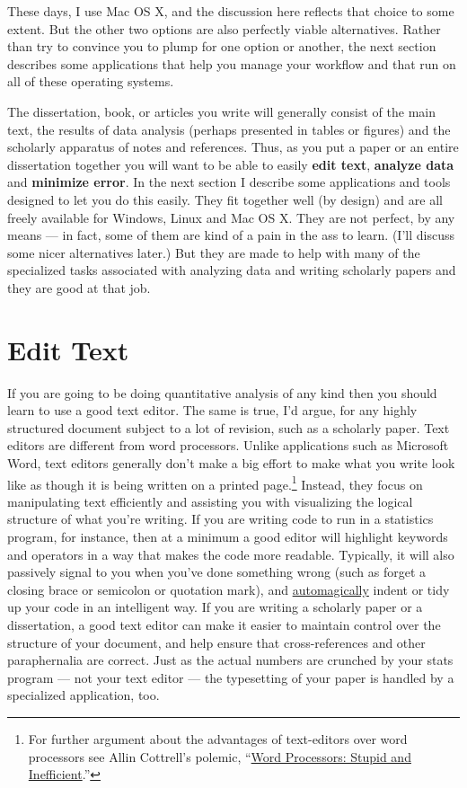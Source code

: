 \documentclass[11pt,article,oneside]{memoir}
\begin{document}
These days, I use Mac OS X, and the discussion here reflects that choice to some extent. But the other two options are also perfectly viable alternatives. Rather than try to convince you to plump for one option or another, the next section describes some applications that help you manage your workflow and that run on all of these operating systems.

The dissertation, book, or articles you write will generally consist of the main text, the results of data analysis (perhaps presented in tables or figures) and the scholarly apparatus of notes and references. Thus, as you  put a paper or an entire dissertation together you will want to be able to easily \textbf{edit text}, \textbf{analyze data} and \textbf{minimize error}. In the next section I describe some applications and tools designed to let you do this easily. They fit together well (by design) and are all freely available for Windows, Linux and Mac OS X. They are not perfect, by any means --- in fact, some of them are kind of a pain in the ass to learn. (I'll discuss some nicer alternatives later.) But they are made to help with many of the specialized tasks associated with analyzing data and writing scholarly papers and they are good at that job.                                                      

\section{Edit Text}
If you are going to be doing quantitative analysis of any kind then you should learn to use a good text editor. The same is true, I'd argue, for any highly structured document subject to a lot of revision, such as a scholarly paper. Text editors are different from word processors. Unlike applications such as Microsoft Word, text editors generally don't make a big effort to make what you write look like as though it is being written on a printed page.\footnote{For further argument about the advantages of text-editors over word processors see Allin Cottrell's polemic, ``\href{http://www.ecn.wfu.edu/~cottrell/wp.html}{Word Processors: Stupid and Inefficient}.''} Instead, they focus on manipulating text efficiently and assisting you with visualizing the logical structure of what you're writing. If you are writing code to run in a statistics program, for instance, then at a minimum a good editor will highlight keywords and operators in a way that makes the code more readable. Typically, it will also passively signal to you when you've done something wrong (such as forget a closing brace or semicolon or quotation mark), and    \href{http://en.wiktionary.org/wiki/automagical}{automagically} indent or tidy up your code in an intelligent way. If you are writing a scholarly paper or a dissertation, a good text editor can make it easier to maintain control over the structure of your document, and help ensure that cross-references and other paraphernalia are correct. Just as the actual numbers are crunched by your stats program --- not your text editor --- the typesetting of your paper is handled by a specialized application, too.
\end{document}
